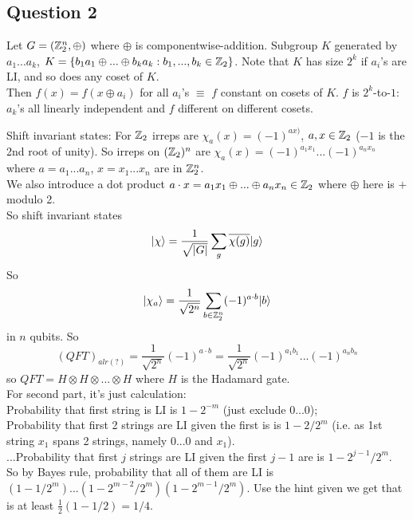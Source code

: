 \documentclass[a4paper]{article}
\begin{document}
\subsection{Question 2}
Let $G=(\mathbb{Z}_2^n, \oplus)$ where $\oplus$ is componentwise-addition. Subgroup $K$ generated by $a_1...a_k$, $K=\{b_1a_1 \oplus ... \oplus b_ka_k:b_1,...,b_k \in \mathbb{Z}_2\}$. Note that $K$ has size $2^k$ if $a_i$'s are LI, and so does any coset of $K$.\\
Then $f(x) = f(x \oplus a_i)$ for all $a_i$'s $\equiv$ $f$ constant on cosets of $K$. $f$ is $2^k$-to-$1$: $a_k$'s all linearly independent and $f$ different on different cosets.

Shift invariant states: For $\mathbb{Z}_2$ irreps are $\chi_a(x) = (-1)^{ax)}$, $a,x \in \mathbb{Z}_2$ ($-1$ is the 2nd root of unity). So irreps on $(\mathbb{Z}_2)^n$ are $\chi_a(x) =(-1)^{a_1x_1} ... (-1)^{a_nx_n}$ where $a=a_1...a_n$, $x=x_1...x_n$ are in $\mathbb{Z}_2^n$.\\
We also introduce a dot product $a \cdot x = a_1x_1 \oplus ... \oplus a_n x_n \in \mathbb{Z}_2$ where $\oplus$ here is $+$ modulo 2.\\
So shift invariant states
$$|\chi\rangle = \frac{1}{\sqrt{|G|}} \sum_g \overline{\chi(g)} |g\rangle$$
So
$$|\chi_a\rangle = \frac{1}{\sqrt{2^n}} \sum_{b \in \mathbb{Z}_2^n} (-1)^{a\cdot b} |b\rangle$$
in $n$ qubits. So
$$(QFT)_{alr(?)} = \frac{1}{\sqrt{2^n}} (-1)^{a \cdot b} = \frac{1}{\sqrt{2^n}} (-1)^{a_1b_1}...(-1)^{a_nb_n}$$
so $QFT = H \otimes H \otimes ... \otimes H$ where $H$ is the Hadamard gate.\\
For second part, it's just calculation:\\
Probability that first string is LI is $1-2^{-m}$ (just exclude $0...0$);\\
Probability that first 2 strings are LI given the first is is $1-2/2^m$ (i.e. as 1st string $x_1$ spans 2 strings, namely $0...0$ and $x_1$).\\
...Probability that first $j$ strings are LI given the first $j-1$ are is $1-2^{j-1}/2^m$.\\
So by Bayes rule, probability that all of them are LI is $(1-1/2^m)...(1-2^{m-2}/2^m)(1-2^{m-1}/2^m)$. Use the hint given we get that is at least $\frac{1}{2}(1-1/2) =1/4$.
\end{document}
